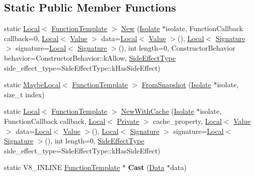 \subsection*{Static Public Member Functions}
\begin{DoxyCompactItemize}
\item 
static \mbox{\hyperlink{classv8_1_1Local}{Local}}$<$ \mbox{\hyperlink{classv8_1_1FunctionTemplate}{Function\+Template}} $>$ \mbox{\hyperlink{classv8_1_1FunctionTemplate_a0724f26034d01ce76bd106b193ab7e7a}{New}} (\mbox{\hyperlink{classv8_1_1Isolate}{Isolate}} $\ast$isolate, Function\+Callback callback=0, \mbox{\hyperlink{classv8_1_1Local}{Local}}$<$ \mbox{\hyperlink{classv8_1_1Value}{Value}} $>$ data=\mbox{\hyperlink{classv8_1_1Local}{Local}}$<$ \mbox{\hyperlink{classv8_1_1Value}{Value}} $>$(), \mbox{\hyperlink{classv8_1_1Local}{Local}}$<$ \mbox{\hyperlink{classv8_1_1Signature}{Signature}} $>$ signature=\mbox{\hyperlink{classv8_1_1Local}{Local}}$<$ \mbox{\hyperlink{classv8_1_1Signature}{Signature}} $>$(), int length=0, Constructor\+Behavior behavior=Constructor\+Behavior\+::k\+Allow, \mbox{\hyperlink{namespacev8_a29711319c2b9fc7716d65faee2f7b9cb}{Side\+Effect\+Type}} side\+\_\+effect\+\_\+type=Side\+Effect\+Type\+::k\+Has\+Side\+Effect)
\item 
static \mbox{\hyperlink{classv8_1_1MaybeLocal}{Maybe\+Local}}$<$ \mbox{\hyperlink{classv8_1_1FunctionTemplate}{Function\+Template}} $>$ \mbox{\hyperlink{classv8_1_1FunctionTemplate_acd9eaca4c7d6de89949b8e1c41f4ba46}{From\+Snapshot}} (\mbox{\hyperlink{classv8_1_1Isolate}{Isolate}} $\ast$isolate, size\+\_\+t index)
\item 
static \mbox{\hyperlink{classv8_1_1Local}{Local}}$<$ \mbox{\hyperlink{classv8_1_1FunctionTemplate}{Function\+Template}} $>$ \mbox{\hyperlink{classv8_1_1FunctionTemplate_a0718db9d9b5ca6e37899ec15b208c0ba}{New\+With\+Cache}} (\mbox{\hyperlink{classv8_1_1Isolate}{Isolate}} $\ast$isolate, Function\+Callback callback, \mbox{\hyperlink{classv8_1_1Local}{Local}}$<$ \mbox{\hyperlink{classv8_1_1Private}{Private}} $>$ cache\+\_\+property, \mbox{\hyperlink{classv8_1_1Local}{Local}}$<$ \mbox{\hyperlink{classv8_1_1Value}{Value}} $>$ data=\mbox{\hyperlink{classv8_1_1Local}{Local}}$<$ \mbox{\hyperlink{classv8_1_1Value}{Value}} $>$(), \mbox{\hyperlink{classv8_1_1Local}{Local}}$<$ \mbox{\hyperlink{classv8_1_1Signature}{Signature}} $>$ signature=\mbox{\hyperlink{classv8_1_1Local}{Local}}$<$ \mbox{\hyperlink{classv8_1_1Signature}{Signature}} $>$(), int length=0, \mbox{\hyperlink{namespacev8_a29711319c2b9fc7716d65faee2f7b9cb}{Side\+Effect\+Type}} side\+\_\+effect\+\_\+type=Side\+Effect\+Type\+::k\+Has\+Side\+Effect)
\item 
\mbox{\label{classv8_1_1FunctionTemplate_abd44ba8482fceb30ffa3d2f8863fac1e}} 
static V8\+\_\+\+I\+N\+L\+I\+NE \mbox{\hyperlink{classv8_1_1FunctionTemplate}{Function\+Template}} $\ast$ {\bfseries Cast} (\mbox{\hyperlink{classv8_1_1Data}{Data}} $\ast$data)
\end{DoxyCompactItemize}
